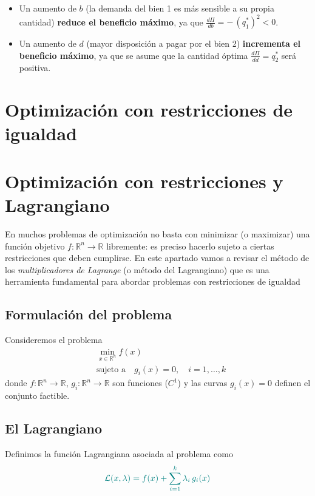 \documentclass{article}
\begin{document}
\begin{itemize}
  \item Un aumento de \(b\) (la demanda del bien 1 es más sensible a su propia cantidad) \textbf{reduce el beneficio máximo}, ya que \(\tfrac{d\Pi}{db}=-\,(q_{1}^{*})^{2}<0\).
  \item Un aumento de \(d\) (mayor disposición a pagar por el bien 2) \textbf{incrementa el beneficio máximo}, ya que se asume que la cantidad óptima \(\tfrac{d\Pi}{dd}=q_{2}^{*}\) será positiva.
\end{itemize}




\newpage
\section{Optimización con restricciones de igualdad}


\section*{Optimización con restricciones y Lagrangiano}

En muchos problemas de optimización no basta con minimizar (o maximizar) una función objetivo \(f\colon\mathbb{R}^n\to\mathbb{R}\) libremente: es preciso hacerlo sujeto a ciertas restricciones que deben cumplirse. En este apartado vamos a revisar el método de los \emph{multiplicadores de Lagrange} (o método del Lagrangiano) que es una herramienta fundamental para abordar problemas con restricciones de igualdad

\subsection*{Formulación del problema}

Consideremos el problema  
\[
\begin{aligned}
&\min_{x\in\mathbb{R}^n} f(x)\\
&\text{sujeto a}\quad g_i(x)=0,\quad i=1,\dots,k
\end{aligned}
\]
donde \(f\colon\mathbb{R}^n\to\mathbb{R}\), \(g_i\colon\mathbb{R}^n\to\mathbb{R}\) son funciones (\(C^1\)) y las curvas \(g_i(x)=0\) definen el conjunto factible.

\subsection*{El Lagrangiano}

Definimos la función Lagrangiana asociada al problema como  
\[\color{teal}
\mathcal{L}(x,\lambda)=f(x)+\sum_{i=1}^k\lambda_i\,g_i(x)
\]
\end{document}

